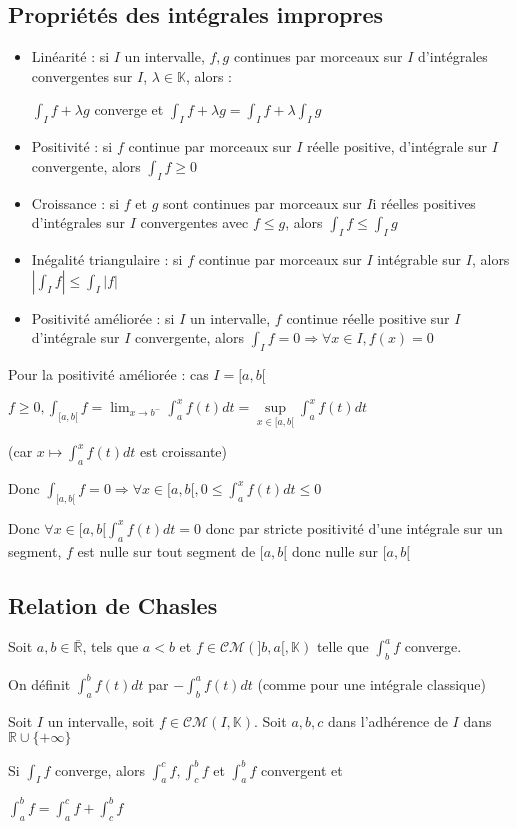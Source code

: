 \documentclass[a4paper,12pt]{book}
\newcommand{\Def}[2]{\begin{tcolorbox}[sharp corners, colback=white,colframe=blue!90!black!75, title=Définition : #1]#2\end{tcolorbox}}
\newcommand{\Prop}[2]{\begin{tcolorbox}[sharp corners, colback=white,colframe=red!90!black!75, title=Proposition : #1]#2\end{tcolorbox}}
\newcommand{\Pre}[1]{\begin{tcolorbox}[sharp corners, colback=white,colframe=green!60!green!30!black!75, title=Preuve]#1\end{tcolorbox}}
\def\R{\mathbb{R}}
\def\K{\mathbb{K}}
\begin{document}
\subsection{Propriétés des intégrales impropres}
\Prop{des intégrales impropres}{\begin{itemize}
\item Linéarité : si $I$ un intervalle, $f,g$ continues par morceaux sur $I$ d'intégrales convergentes sur $I$, $\lambda\in\K$, alors : \par \begin{center}$\int_If + \lambda g$ converge et $\int_If+\lambda g = \int_I f+\lambda\int_Ig$ \end{center}
\item Positivité : si $f$ continue par morceaux sur $I$ réelle positive, d'intégrale sur $I$ convergente, alors $\int_If\geq 0$
\item Croissance : si $f$ et $g$ sont continues par morceaux sur $I$i réelles positives d'intégrales sur $I$ convergentes avec $f\leq g$, alors $\int_If\leq \int_Ig$
\item Inégalité triangulaire : si $f$ continue par morceaux sur $I$ intégrable sur $I$, alors $\left\vert\int_If\right\vert \leq\int_I\vert f\vert$ 
\item Positivité améliorée : si $I$ un intervalle, $f$ continue réelle positive sur $I$ d'intégrale sur $I$ convergente, alors $\int_If = 0 \Rightarrow \forall x\in I, f(x)=0$
\end{itemize}}
\Pre{Pour la positivité améliorée : cas $I = [a,b[$ \par $f\geq 0, \int_{[a,b[}f = \lim_{x\to b^-}\int_a^xf(t)dt = \sup\limits_{x\in[a,b[}\int_a^xf(t)dt$ \par (car $x\mapsto \int_a^xf(t)dt$ est croissante) \par Donc $\int_{[a,b[}f = 0 \Rightarrow \forall x\in [a,b[, 0\leq \int_a^x f(t)dt\leq 0$ \par Donc $\forall x\in[a,b[\int_a^xf(t)dt=0$ donc par stricte positivité d'une intégrale sur un segment, $f$ est nulle sur tout segment de $[a,b[$ donc nulle sur $[a,b[$}

\subsection{Relation de Chasles}
\Def{}{Soit $a,b\in\bar{\R}$, tels que $a<b$ et $f\in\mathcal{CM}(]b,a[,\K)$ telle que $\int_b^af$ converge. \par On définit $\int_a^bf(t)dt$ par $-\int_b^af(t)dt$ (comme pour une intégrale classique)}
\Prop{Relation de Chasles}{Soit $I$ un intervalle, soit $f\in\mathcal{CM}(I,\K)$. Soit $a,b,c$ dans l'adhérence de $I$ dans $\R\cup\{+\infty\}$ \par Si $\int_If$ converge, alors $\int_a^cf, \int_c^bf$ et $\int_a^bf$ convergent et \par\begin{center}$\int_a^bf=\int_a^cf+\int_c^bf$\end{center}}
\end{document}
